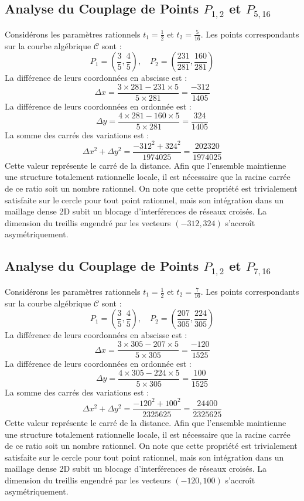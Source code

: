 \documentclass[12pt, a4paper]{article}
\begin{document}
\subsection{Analyse du Couplage de Points $P_{1,2}$ et $P_{5,16}$}
Considérons les paramètres rationnels $t_1 = \frac{1}{2}$ et $t_2 = \frac{5}{16}$.
Les points correspondants sur la courbe algébrique $\mathcal{C}$ sont :
$$ P_1 = \left( \frac{3}{5}, \frac{4}{5} \right), \quad P_2 = \left( \frac{231}{281}, \frac{160}{281} \right) $$
La différence de leurs coordonnées en abscisse est :
$$ \Delta x = \frac{3 \times 281 - 231 \times 5}{5 \times 281} = \frac{-312}{1405} $$
La différence de leurs coordonnées en ordonnée est :
$$ \Delta y = \frac{4 \times 281 - 160 \times 5}{5 \times 281} = \frac{324}{1405} $$
La somme des carrés des variations est :
$$ \Delta x^2 + \Delta y^2 = \frac{ -312^2 + 324^2 }{ 1974025 } = \frac{ 202320 }{ 1974025 } $$
Cette valeur représente le carré de la distance. Afin que l'ensemble maintienne une structure totalement rationnelle locale, il est nécessaire que la racine carrée de ce ratio soit un nombre rationnel. On note que cette propriété est trivialement satisfaite sur le cercle pour tout point rationnel, mais son intégration dans un maillage dense 2D subit un blocage d'interférences de réseaux croisés. La dimension du treillis engendré par les vecteurs $( -312, 324 )$ s'accroît asymétriquement.


\subsection{Analyse du Couplage de Points $P_{1,2}$ et $P_{7,16}$}
Considérons les paramètres rationnels $t_1 = \frac{1}{2}$ et $t_2 = \frac{7}{16}$.
Les points correspondants sur la courbe algébrique $\mathcal{C}$ sont :
$$ P_1 = \left( \frac{3}{5}, \frac{4}{5} \right), \quad P_2 = \left( \frac{207}{305}, \frac{224}{305} \right) $$
La différence de leurs coordonnées en abscisse est :
$$ \Delta x = \frac{3 \times 305 - 207 \times 5}{5 \times 305} = \frac{-120}{1525} $$
La différence de leurs coordonnées en ordonnée est :
$$ \Delta y = \frac{4 \times 305 - 224 \times 5}{5 \times 305} = \frac{100}{1525} $$
La somme des carrés des variations est :
$$ \Delta x^2 + \Delta y^2 = \frac{ -120^2 + 100^2 }{ 2325625 } = \frac{ 24400 }{ 2325625 } $$
Cette valeur représente le carré de la distance. Afin que l'ensemble maintienne une structure totalement rationnelle locale, il est nécessaire que la racine carrée de ce ratio soit un nombre rationnel. On note que cette propriété est trivialement satisfaite sur le cercle pour tout point rationnel, mais son intégration dans un maillage dense 2D subit un blocage d'interférences de réseaux croisés. La dimension du treillis engendré par les vecteurs $( -120, 100 )$ s'accroît asymétriquement.
\end{document}
